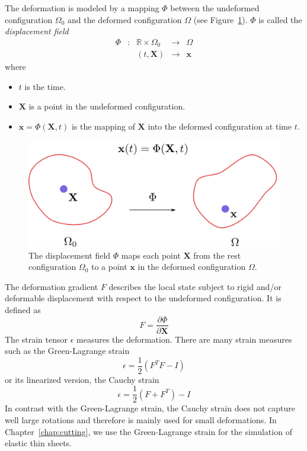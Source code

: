 The deformation is modeled by a mapping $\Phi$ between the undeformed configuration $\Omega_{0}$ and the deformed configuration $\Omega$ (see Figure~\ref{fig:displacementField}). $\Phi$ is called the \emph{displacement field}
\begin{equation}
\begin{array}{lllll}
\Phi & : & \mathbb{R} \times \Omega_{0} & \longrightarrow & \Omega \\
	 &  & \left(t, \mathbf{X}\right) & \longrightarrow & \mathbf{x}
\end{array}
\end{equation}
where 
\begin{itemize}
\item $t$ is the time.
\item $\mathbf{X}$ is a point in the undeformed configuration.
\item $\mathbf{x}=\Phi(\mathbf{X},t)$ is the mapping of $\mathbf{X}$ into the deformed configuration at time $t$.
\end{itemize}
\begin{figure}[H]
\centering
\includegraphics[scale=0.4]{./images/continuum_mechanics/displacementField.png}
\caption[STAR mechanics: Displacement field]{\label{fig:displacementField}
 The displacement field $\Phi$ maps each point $\mathbf{X}$ from the rest configuration $\Omega_{0}$ to a point $\mathbf{x}$ in the deformed configuration $\Omega$.}
\end{figure}
The deformation gradient $F$ describes the local state subject to rigid and/or deformable displacement with respect to the undeformed configuration. It is defined as
\begin{equation}
\label{eq:deformationGradient}
\displaystyle F = \frac{\partial \Phi}{\partial \mathbf{X}}
\end{equation}
The strain tensor $\epsilon$ measures the deformation.
There are many strain measures such as the Green-Lagrange strain
\begin{equation}
\label{eq:greenLagrangeStrain}
\displaystyle \epsilon = \frac{1}{2}\left(F^{T}F - I\right)
\end{equation}
or its linearized version, the Cauchy strain 
\begin{equation}
\label{eq:cauchyStrain}
\displaystyle \epsilon = \frac{1}{2}\left( F + F^{T} \right)-I
\end{equation}
In contrast with the Green-Lagrange strain, the Cauchy strain does not capture well large rotations and therefore is mainly used for small deformations. In Chapter~\ref{chap:cutting}, we use the Green-Lagrange strain for the simulation of elastic thin sheets.

